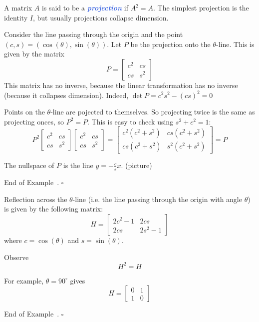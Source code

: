 \documentclass[10pt]{article}
\newcommand{\demph}[1]{\textcolor{RoyalBlue}{\textbf{\slshape #1}}} %
\theoremstyle{definition}
\newtheorem{example}[theorem]{Example}
\renewenvironment{example}
{\begin{oldexample}}
  {\par\smallskip\hfill   End of Example~\theexample. $\square$    \par\end{oldexample}}
\begin{document}
A matrix $A$ is said to be a \demph{projection} if $A^{2}=A$. The simplest
projection is the identity $I$, but usually projections collapse dimension. 

\begin{example}[Projections]
  Consider the line passing through the origin and the point
  $(c,s)=(\cos(\theta),\sin(\theta))$. Let $P$ be the projection onto the
  $\theta$-line. This is given by the matrix
  \begin{equation*}
    P =
    \begin{bmatrix}
      c^{2}&cs\\cs&s^{2}
    \end{bmatrix}
  \end{equation*}
  This matrix has no inverse, because the linear transformation has no inverse
  (because it collapses dimension). Indeed, $\det P = c^{2}s^{2}- (cs)^{2}=0$

  Points on the $\theta$-line are pojected to themselves. So projecting twice
  is the same as projecting onces, so $P^{2}=P$. This is easy to check using
  $s^{2}+c^{2}=1$:
  \begin{equation*}
    P^{2}
    \begin{bmatrix}
      c^{2}&cs\\
      cs&s^{2}
    \end{bmatrix}
    \begin{bmatrix}
      c^{2}&cs\\
      cs&s^{2}
    \end{bmatrix}
    =
    \begin{bmatrix}
      c^{2}(c^{2}+s^{2})& cs(c^{2}+s^{2})\\
      cs(c^{2}+s^{2})& s^{2}(c^{2}+s^{2})
    \end{bmatrix}
    = P
  \end{equation*}

  The nullspace of $P$ is the line $y=-\frac{c}{s}x$. (picture)
\end{example}

\begin{example}[Reflection]
  Reflection across the $\theta$-line (i.e. the line passing through the
  origin with angle $\theta$) is given by the following matrix:
  \begin{equation*}
    H =
    \begin{bmatrix}
      2c^{2}-1&2cs\\
      2cs&2s^{2}-1
    \end{bmatrix}
  \end{equation*}
  where $c=\cos(\theta)$ and $s=\sin(\theta)$.

  Observe
  \begin{equation*}
    H^{2}=H
  \end{equation*}

  For example, $\theta=90^{\circ}$ gives
  \begin{equation*}
    H =
    \begin{bmatrix}
      0&1\\
      1&0
    \end{bmatrix}
  \end{equation*}
\end{example}
\end{document}
